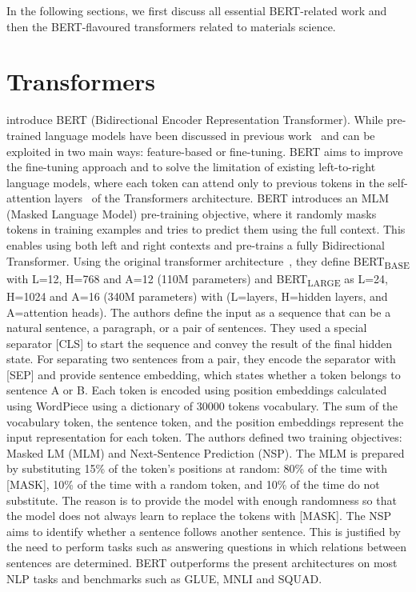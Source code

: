 In the following sections, we first discuss all essential BERT-related work and then the BERT-flavoured transformers related to materials science. 

\section{Transformers}

\cite{devlin2018bert} introduce BERT (Bidirectional Encoder Representation Transformer). 
While pre-trained language models have been discussed in previous work~\cite{radford2018improving} and can be exploited in two main ways: feature-based or fine-tuning. 
BERT aims to improve the fine-tuning approach and to solve the limitation of existing left-to-right language models, where each token can attend only to previous tokens in the self-attention layers~\cite{vaswani2017attention} of the Transformers architecture. 
BERT introduces an MLM (Masked Language Model) pre-training objective, where it randomly masks tokens in training examples and tries to predict them using the full context. This enables using both left and right contexts and pre-trains a fully Bidirectional Transformer.
Using the original transformer architecture~\cite{vaswani2017attention}, they define BERT\textsubscript{BASE} with L=12, H=768 and A=12 (110M parameters) and BERT\textsubscript{LARGE} as L=24, H=1024 and A=16 (340M parameters) with (L=layers, H=hidden layers, and A=attention heads).
The authors define the input as a sequence that can be a natural sentence, a paragraph, or a pair of sentences. They used a special separator [CLS] to start the sequence and convey the result of the final hidden state. For separating two sentences from a pair, they encode the separator with [SEP] and provide sentence embedding, which states whether a token belongs to sentence A or B. 
Each token is encoded using position embeddings calculated using WordPiece using a dictionary of 30000 tokens vocabulary. 
The sum of the vocabulary token, the sentence token, and the position embeddings represent the input representation for each token. 
The authors defined two training objectives: Masked LM (MLM) and Next-Sentence Prediction (NSP). 
The MLM is prepared by substituting 15\% of the token's positions at random: 80\% of the time with [MASK], 10\% of the time with a random token, and 10\% of the time do not substitute. The reason is to provide the model with enough randomness so that the model does not always learn to replace the tokens with [MASK]. 
The NSP aims to identify whether a sentence follows another sentence. This is justified by the need to perform tasks such as answering questions in which relations between sentences are determined. 
BERT outperforms the present architectures on most NLP tasks and benchmarks such as GLUE, MNLI and SQUAD. 

